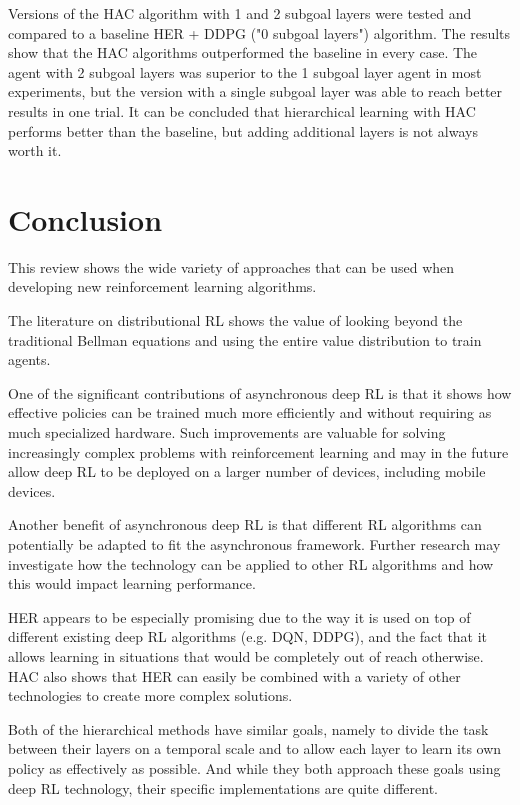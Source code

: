 \documentclass[runningheads]{llncs}
\begin{document}
Versions of the HAC algorithm with 1 and 2 subgoal layers were tested and compared to a baseline HER + DDPG ("0 subgoal layers") algorithm. The results show that the HAC algorithms outperformed the baseline in every case. The agent with 2 subgoal layers was superior to the 1 subgoal layer agent in most experiments, but the version with a single subgoal layer was able to reach better results in one trial. It can be concluded that hierarchical learning with HAC performs better than the baseline, but adding additional layers is not always worth it.

\section{Conclusion}

This review shows the wide variety of approaches that can be used when developing new reinforcement learning algorithms.

The literature on distributional RL shows the value of looking beyond the traditional Bellman equations and using the entire value distribution to train agents.

One of the significant contributions of asynchronous deep RL is that it shows how effective policies can be trained much more efficiently and without requiring as much specialized hardware. Such improvements are valuable for solving increasingly complex problems with reinforcement learning and may in the future allow deep RL to be deployed on a larger number of devices, including mobile devices.

Another benefit of asynchronous deep RL is that different RL algorithms can potentially be adapted to fit the asynchronous framework. Further research may investigate how the technology can be applied to other RL algorithms and how this would impact learning performance.

HER appears to be especially promising due to the way it is used on top of different existing deep RL algorithms (e.g. DQN, DDPG), and the fact that it allows learning in situations that would be completely out of reach otherwise. HAC also shows that HER can easily be combined with a variety of other technologies to create more complex solutions.

Both of the hierarchical methods have similar goals, namely to divide the task between their layers on a temporal scale and to allow each layer to learn its own policy as effectively as possible. And while they both approach these goals using deep RL technology, their specific implementations are quite different.


%
%



\end{document}
